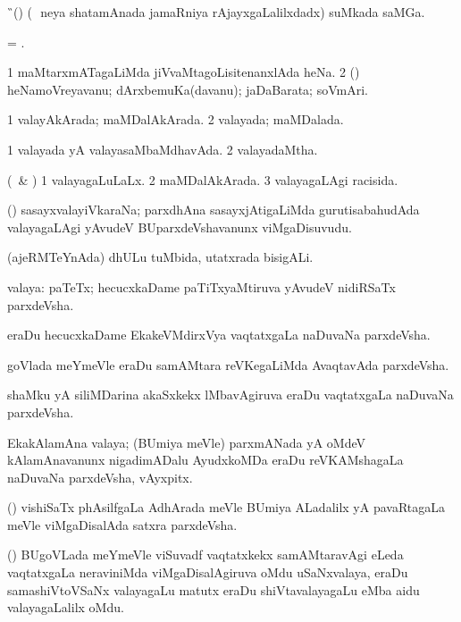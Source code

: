 \bentry 
{} 
\gl{\nA} 
\bmng
\G\
(\ca) (\kanmu\ \,neya shatamAnada jamaRniya rAjayxgaLalilxdadx) suMkada saMGa.
\emng
\eentry

\bentry
{} 
\gl{\nA} 
\bmng
= .
\emng 
\eentry

\bentry
{} 
\gl{\nA} 
\bmng
\bnum
\num{1} maMtarxmATagaLiMda jiVvaMtagoLisitenanxlAda heNa. 
\num{2} (\AmA) heNamoVreyavanu;  dArxbemuKa(davanu); jaDaBarata; soVmAri.
\enum
\emng
\eentry
 
\bentry
{} 
\gl{\gu} 
\bmng
\bnum
\num{1} valayAkArada; maMDalAkArada. 
\num{2} valayada; maMDalada.
\enum
\emng
\eentry

\bentry
{} 
\gl{\gu} 
\bmng
\bnum
\num{1} valayada yA valayasaMbaMdhavAda. 
\num{2} valayadaMtha.
\enum
\emng
\eentry

\bentry
{} 
\gl{\gu}
\bmng
(\savi\ \& \pArxvi) 
\bnum
\num{1} valayagaLuLaLx. 
\num{2} maMDalAkArada. 
\num{3} valayagaLAgi racisida.
\enum
\emng
\eentry

\bentry
{}  
\gl{\nA}  
\bmng
(\savi) sasayxvalayiVkaraNa; parxdhAna sasayxjAtigaLiMda gurutisabahudAda valayagaLAgi yAvudeV BUparxdeVshavanunx viMgaDisuvudu.
\emng
\eentry

\bentry
{} 
\gl{\nA} 
\bmng
(ajeRMTeYnAda) dhULu tuMbida, utatxrada bisigALi. 
\emng
\eentry

\bentry
{} 
\gl{\nA}
\bmng
\bnum
{} valaya: 
\banum
{} paTeTx; hecucxkaDame paTiTxyaMtiruva yAvudeV nidiRSaTx parxdeVsha.  

 eraDu hecucxkaDame EkakeVMdirxVya vaqtatxgaLa naDuvaNa parxdeVsha. 

 goVlada meYmeVle eraDu samAMtara reVKegaLiMda AvaqtavAda parxdeVsha. 

 shaMku yA siliMDarina akaSxkekx lMbavAgiruva eraDu vaqtatxgaLa naDuvaNa parxdeVsha.  

\hypertarget{zone(1)1e}{}
 EkakAlamAna valaya; (BUmiya meVle) parxmANada yA oMdeV kAlamAnavanunx nigadimADalu AyudxkoMDa eraDu reVKAMshagaLa naDuvaNa parxdeVsha, vAyxpitx.  

 (\BUvi) vishiSaTx phAsilfgaLa AdhArada meVle BUmiya ALadalilx yA pavaRtagaLa meVle viMgaDisalAda satxra parxdeVsha.

 (\BUgoV) BUgoVLada meYmeVle viSuvadf vaqtatxkekx samAMtaravAgi eLeda  vaqtatxgaLa neraviniMda viMgaDisalAgiruva oMdu uSaNxvalaya, eraDu samashiVtoVSaNx valayagaLu matutx eraDu shiVtavalayagaLu eMba aidu valayagaLalilx oMdu. \quad\quad {} 

